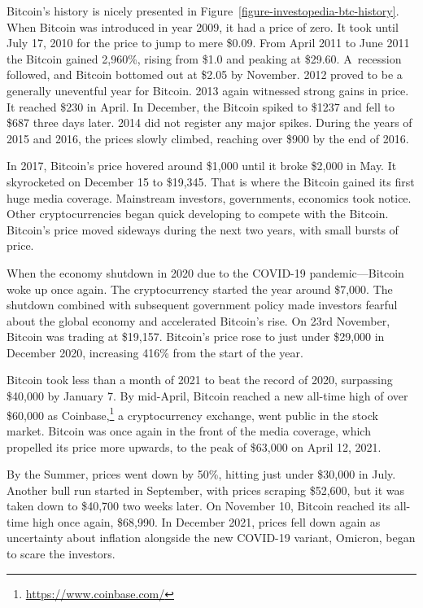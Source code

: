 Bitcoin's history is nicely presented in Figure~\ref{figure-investopedia-btc-history}. When Bitcoin was introduced in year 2009, it had a price of zero. It took until July 17, 2010 for the price to jump to mere \$0.09. From April 2011 to June 2011 the Bitcoin gained 2,960\%, rising from \$1.0 and peaking at \$29.60. A~recession followed, and Bitcoin bottomed out at \$2.05 by November. 2012 proved to be a generally uneventful year for Bitcoin. 2013 again witnessed strong gains in price. It reached \$230 in April. In December, the Bitcoin spiked to \$1237 and fell to \$687 three days later. 2014 did not register any major spikes. During the years of 2015 and 2016, the prices slowly climbed, reaching over \$900 by the end of 2016.

In 2017, Bitcoin's price hovered around \$1,000 until it broke \$2,000 in May. It skyrocketed on December 15 to \$19,345. That is where the Bitcoin gained its first huge media coverage. Mainstream investors, governments, economics took notice. Other cryptocurrencies began quick developing to compete with the Bitcoin. Bitcoin's price moved sideways during the next two years, with small bursts of price.

When the economy shutdown in 2020 due to the COVID-19 pandemic---Bitcoin woke up once again. The cryptocurrency started the year around \$7,000. The shutdown combined with subsequent government policy made investors fearful about the global economy and accelerated Bitcoin's rise. On 23rd November, Bitcoin was trading at \$19,157. Bitcoin's price rose to just under \$29,000 in December 2020, increasing 416\% from the start of the year.

Bitcoin took less than a month of 2021 to beat the record of 2020, surpassing \$40,000 by January 7. By mid-April, Bitcoin reached a new all-time high of over \$60,000 as Coinbase,\footnote{\url{https://www.coinbase.com/}} a cryptocurrency exchange, went public in the stock market. Bitcoin was once again in the front of the media coverage, which propelled its price more upwards, to the peak of \$63,000 on April 12, 2021.

By the Summer, prices went down by 50\%, hitting just under \$30,000 in July. Another bull run started in September, with prices scraping \$52,600, but it was taken down to \$40,700 two weeks later. On November 10, Bitcoin reached its all-time high once again, \$68,990. In December 2021, prices fell down again as uncertainty about inflation alongside the new COVID-19 variant, Omicron, began to scare the investors.

